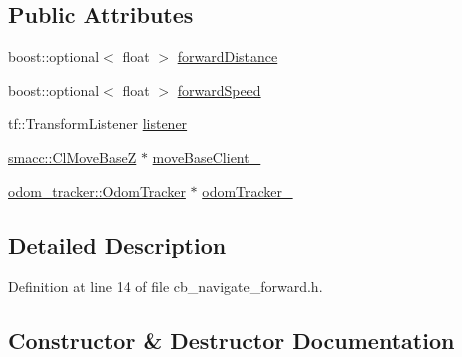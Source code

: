 \subsection*{Public Attributes}
\begin{DoxyCompactItemize}
\item 
boost\+::optional$<$ float $>$ \hyperlink{classsm__dance__bot_1_1move__base__z__client_1_1CbNavigateForward_a2c1a04f86c3a0c40d516654fa0b4944a}{forward\+Distance}
\item 
boost\+::optional$<$ float $>$ \hyperlink{classsm__dance__bot_1_1move__base__z__client_1_1CbNavigateForward_a19b51c72123731c4f0557f1a723e37fb}{forward\+Speed}
\item 
tf\+::\+Transform\+Listener \hyperlink{classsm__dance__bot_1_1move__base__z__client_1_1CbNavigateForward_ada990a8520ff4e8e4051e7043958c636}{listener}
\item 
\hyperlink{classsmacc_1_1ClMoveBaseZ}{smacc\+::\+Cl\+Move\+BaseZ} $\ast$ \hyperlink{classsm__dance__bot_1_1move__base__z__client_1_1CbNavigateForward_a717bce9f5100540c48e413725e476408}{move\+Base\+Client\+\_\+}
\item 
\hyperlink{classodom__tracker_1_1OdomTracker}{odom\+\_\+tracker\+::\+Odom\+Tracker} $\ast$ \hyperlink{classsm__dance__bot_1_1move__base__z__client_1_1CbNavigateForward_affc6ced1bd3ba8cb80461a1a60c65d04}{odom\+Tracker\+\_\+}
\end{DoxyCompactItemize}


\subsection{Detailed Description}


Definition at line 14 of file cb\+\_\+navigate\+\_\+forward.\+h.



\subsection{Constructor \& Destructor Documentation}
